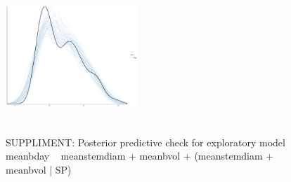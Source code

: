 \documentclass{article}\usepackage[]{graphicx}\usepackage[]{color}
\begin{document}
\begin{figure}[h!]
\includegraphics[width=5cm, height=5cm]{moodle_ppcheck.pdf}\\
\caption{SUPPLIMENT: Posterior predictive check for exploratory model meanbday ~ meanstemdiam + meanbvol + (meanstemdiam + meanbvol | SP)}
\end{figure}
\end{document}

